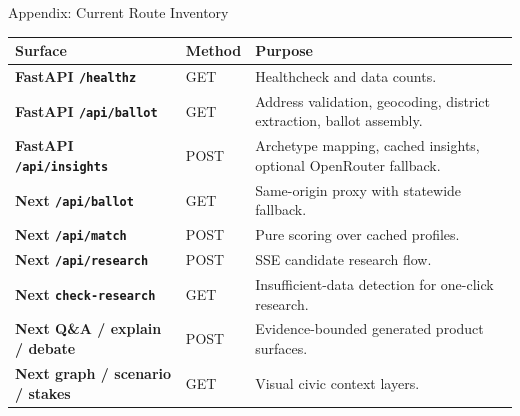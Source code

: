 \documentclass[aspectratio=169,10pt]{beamer}
\begin{document}
\begin{frame}{Appendix: Current Route Inventory}
  \scriptsize
  \begin{tabularx}{\linewidth}{>{\bfseries}p{2.35cm} p{1.7cm} X}
    \toprule
    Surface & Method & Purpose \\
    \midrule
    FastAPI \texttt{/healthz} & GET & Healthcheck and data counts. \\
    FastAPI \texttt{/api/ballot} & GET & Address validation, geocoding, district extraction, ballot assembly. \\
    FastAPI \texttt{/api/insights} & POST & Archetype mapping, cached insights, optional OpenRouter fallback. \\
    Next \texttt{/api/ballot} & GET & Same-origin proxy with statewide fallback. \\
    Next \texttt{/api/match} & POST & Pure scoring over cached profiles. \\
    Next \texttt{/api/research} & POST & SSE candidate research flow. \\
    Next \texttt{check-research} & GET & Insufficient-data detection for one-click research. \\
    Next Q\&A / explain / debate & POST & Evidence-bounded generated product surfaces. \\
    Next graph / scenario / stakes & GET & Visual civic context layers. \\
    \bottomrule
  \end{tabularx}
\end{frame}
\end{document}
